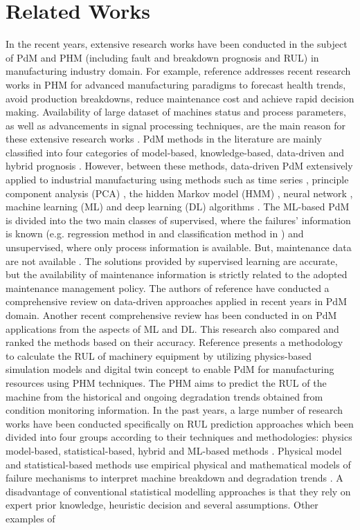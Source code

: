 \documentclass[conference]{IEEEtran}
\begin{document}
\section{Related Works}
\label{sec:Related_works}
In the recent years, extensive research works have been conducted in the subject of PdM and PHM (including fault and breakdown prognosis and RUL) in manufacturing industry domain. For example, reference \cite{Xia2018} addresses recent research works in PHM for advanced manufacturing paradigms to forecast health trends, avoid production breakdowns, reduce maintenance cost and achieve rapid decision making. Availability of large dataset of machines status and process parameters, as well as advancements in signal processing techniques, are the main reason for these extensive research works \cite{Susto2015}. PdM methods in the literature are mainly classified into four categories of model-based, knowledge-based, data-driven and hybrid prognosis \cite{Liao2014}. However, between these methods, data-driven PdM extensively applied to industrial manufacturing using methods such as time series \cite{Lin2019}, principle component analysis (PCA) \cite{You2015}, the hidden Markov model (HMM) \cite{Vrignat2015}, neural network \cite{Malhi2011}, machine learning (ML) \cite{Jiang2018,Carvalho2019} and deep learning (DL) algorithms \cite{Namuduri2020,Li2019a}. The ML-based PdM is divided into the two main classes of supervised, where the failures' information is known (e.g. regression method in \cite{Kumar2019} and classification method in \cite{Canizo2017}) and unsupervised, where only process information is available. But, maintenance data are not available \cite{Jiang2018}. The solutions provided by supervised learning are accurate, but the availability of maintenance information is strictly related to the adopted maintenance management policy. The authors of reference \cite{Lei2018} have conducted a comprehensive review on data-driven approaches applied in recent years in PdM domain. Another recent comprehensive review has been conducted in \cite{Zhang2019} on PdM applications from the aspects of ML and DL. This research also compared and ranked the methods based on their accuracy. Reference \cite{Werner2020,Aivaliotis2019} presents a methodology to calculate the RUL of machinery equipment by utilizing physics-based simulation models and digital twin concept to enable PdM for manufacturing resources using PHM techniques. The PHM aims to predict the RUL of the machine from the historical and ongoing degradation trends obtained from condition monitoring information. In the past years, a large number of research works have been conducted specifically on RUL prediction approaches which been divided into four groups according to their techniques and methodologies: physics model-based, statistical-based, hybrid and ML-based methods \cite{Jiang2018,Aivaliotis2019,Li2020}. Physical model and statistical-based methods use empirical physical and mathematical models of failure mechanisms to interpret machine breakdown and degradation trends \cite{Cai2020,Zhang2020,Ahmad2019}. A disadvantage of conventional statistical modelling approaches is that they rely on expert prior knowledge, heuristic decision and several assumptions. Other examples of 
\end{document}
